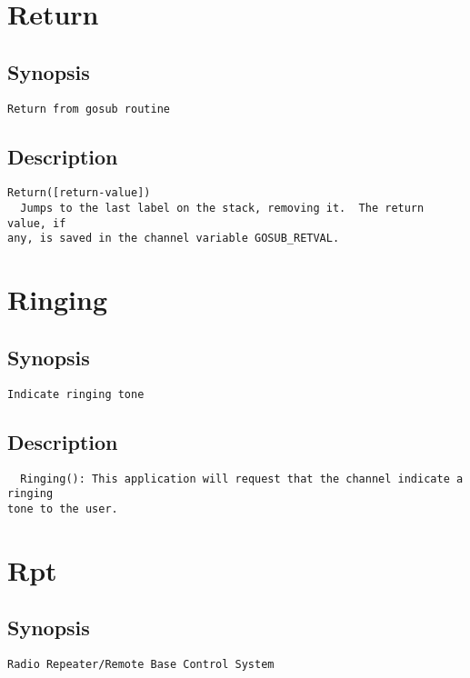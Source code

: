 \section{Return}
\subsection{Synopsis}
\begin{verbatim}
Return from gosub routine
\end{verbatim}
\subsection{Description}
\begin{verbatim}
Return([return-value])
  Jumps to the last label on the stack, removing it.  The return value, if
any, is saved in the channel variable GOSUB_RETVAL.

\end{verbatim}


\section{Ringing}
\subsection{Synopsis}
\begin{verbatim}
Indicate ringing tone
\end{verbatim}
\subsection{Description}
\begin{verbatim}
  Ringing(): This application will request that the channel indicate a ringing
tone to the user.

\end{verbatim}


\section{Rpt}
\subsection{Synopsis}
\begin{verbatim}
Radio Repeater/Remote Base Control System
\end{verbatim}
